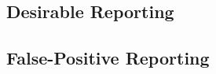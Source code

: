 \documentclass[a4paper,fleqn,usenatbib]{mnras}
\begin{document}
\subsection{Desirable Reporting}

%
%
%

\subsection{False-Positive Reporting}
\end{document}
